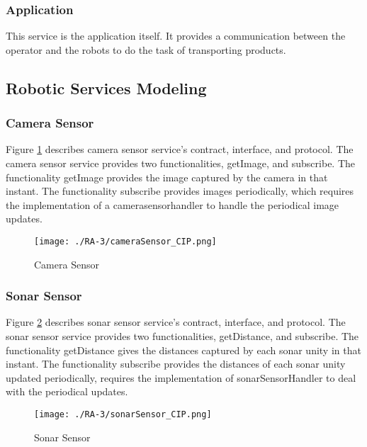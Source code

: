 \subsubsection*{Application}
This service is the application itself. It provides a communication between the operator and the robots to do the task of transporting products.

\subsection{Robotic Services Modeling}
\subsubsection{Camera Sensor} %
Figure \ref{fig:camerasensor_cip} describes camera sensor service's contract, interface, and protocol. The camera sensor service provides two functionalities, getImage, and subscribe. The functionality getImage provides the image captured by the camera in that instant. The functionality subscribe provides images periodically, which requires the implementation of a camerasensorhandler to handle the periodical image updates.
\begin{figure}[ht!]
 \centering
 \texttt{[image: ./RA-3/cameraSensor\_CIP.png]}
 \caption{Camera Sensor}
 \label{fig:camerasensor_cip}
\end{figure}

\subsubsection{Sonar Sensor} %
Figure \ref{fig:sonarsensor_cip} describes sonar sensor service's contract, interface, and protocol. The sonar sensor service provides two functionalities, getDistance, and subscribe. The functionality getDistance gives the distances captured by each sonar unity in that instant. The functionality subscribe provides the distances of each sonar unity updated periodically, requires the implementation of sonarSensorHandler to deal with the periodical updates.
\begin{figure}[ht!]
 \centering
 \texttt{[image: ./RA-3/sonarSensor\_CIP.png]}
 \caption{Sonar Sensor}
 \label{fig:sonarsensor_cip}
\end{figure}

